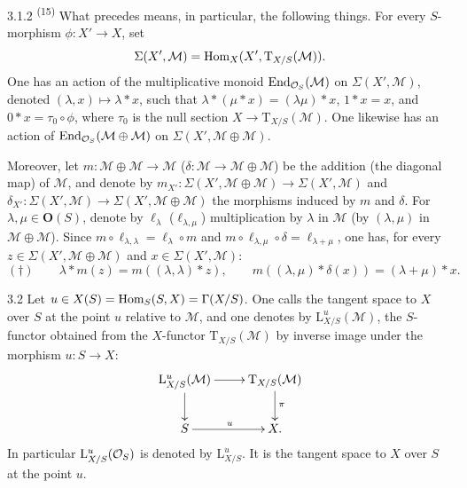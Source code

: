 \begin{scholium}{3.1.2}
\label{II.3.1.2}
\textup{\textsuperscript{(15)}}
What precedes means, in particular, the following things. For every
\(S\)-morphism \(\phi\colon X'\to X\), set
\[
\Sigma(X',\mathcal{M})=\operatorname{Hom}_X(X',\mathrm{T}_{X/S}(\mathcal{M})).
\]
One has an action of the multiplicative monoid
\(\operatorname{End}_{\mathcal{O}_S}(\mathcal{M})\) on \(\Sigma(X',\mathcal{M})\), denoted
\((\lambda,x)\mapsto\lambda\ast x\), such that
\(\lambda\ast(\mu\ast x)=(\lambda\mu)\ast x\), \(1\ast x=x\), and
\(0\ast x=\tau_0\circ\phi\), where \(\tau_0\) is the null section
\(X\to\mathrm{T}_{X/S}(\mathcal{M})\). One likewise has an action of
\(\operatorname{End}_{\mathcal{O}_S}(\mathcal{M}\oplus\mathcal{M})\) on
\(\Sigma(X',\mathcal{M}\oplus\mathcal{M})\).%
{\renewcommand{\thefootnote}{(16)}}

Moreover, let \(m\colon\mathcal{M}\oplus\mathcal{M}\to\mathcal{M}\)
(\resp \(\delta\colon\mathcal{M}\to\mathcal{M}\oplus\mathcal{M}\)) be the
addition (\resp the diagonal map) of \(\mathcal{M}\), and denote by
\(m_{X'}\colon\Sigma(X',\mathcal{M}\oplus\mathcal{M})\to\Sigma(X',\mathcal{M})\)
and
\(\delta_{X'}\colon\Sigma(X',\mathcal{M})\to\Sigma(X',\mathcal{M}\oplus\mathcal{M})\)
the morphisms induced by \(m\) and \(\delta\). For \(\lambda,\mu\in\mathbf{O}(S)\),
denote by \(\ell_{\lambda}\) (\resp \(\ell_{\lambda,\mu}\)) multiplication by
\(\lambda\) in \(\mathcal{M}\) (\resp by \((\lambda,\mu)\) in
\(\mathcal{M}\oplus\mathcal{M}\)).
Since \(m\circ\ell_{\lambda,\lambda}=\ell_{\lambda}\circ m\) and
\(m\circ\ell_{\lambda,\mu}\circ\delta=\ell_{\lambda+\mu}\), one has, for every
\(z\in\Sigma(X',\mathcal{M}\oplus\mathcal{M})\) and
\(x\in\Sigma(X',\mathcal{M})\):
\[
(\dagger)\qquad
\lambda\ast m(z)=m((\lambda,\lambda)\ast z),\qquad
m((\lambda,\mu)\ast\delta(x))=(\lambda+\mu)\ast x.
\]
\end{scholium}

\begin{definition}{3.2}
\label{II.3.2}
Let \(u\in X(S)=\operatorname{Hom}_S(S,X)=\Gamma(X/S)\). One calls the tangent space to
\(X\) over \(S\) at the point \(u\) relative to \(\mathcal{M}\), and one denotes
by \(\mathrm{L}^{u}_{X/S}(\mathcal{M})\), the \(S\)-functor obtained from the
\(X\)-functor \(\mathrm{T}_{X/S}(\mathcal{M})\) by inverse image under the
morphism \(u\colon S\to X\):
\[
\xymatrix{
  \mathrm{L}^{u}_{X/S}(\mathcal{M}) \ar[r] \ar[d]
    & \mathrm{T}_{X/S}(\mathcal{M}) \ar[d]^{\pi} \\
  S \ar[r]^{u}
    & X.
}
\]
In particular \(\mathrm{L}^{u}_{X/S}(\mathcal{O}_S)\) is denoted by
\(\mathrm{L}^{u}_{X/S}\). It is the tangent space to \(X\) over \(S\) at the
point \(u\).
\end{definition}

